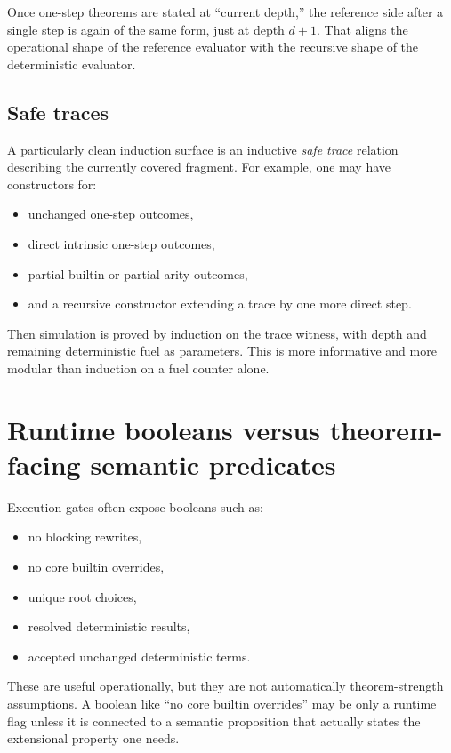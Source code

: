\documentclass[11pt]{article}
\newcommand{\term}[1]{\emph{#1}}
\begin{document}
Once one-step theorems are stated at ``current depth,'' the reference side after a single step is again of the same form, just at depth $d+1$. That aligns the operational shape of the reference evaluator with the recursive shape of the deterministic evaluator.

\subsection{Safe traces}

A particularly clean induction surface is an inductive \term{safe trace} relation describing the currently covered fragment. For example, one may have constructors for:

\begin{itemize}
  \item unchanged one-step outcomes,
  \item direct intrinsic one-step outcomes,
  \item partial builtin or partial-arity outcomes,
  \item and a recursive constructor extending a trace by one more direct step.
\end{itemize}

Then simulation is proved by induction on the trace witness, with depth and remaining deterministic fuel as parameters. This is more informative and more modular than induction on a fuel counter alone.

\section{Runtime booleans versus theorem-facing semantic predicates}

Execution gates often expose booleans such as:

\begin{itemize}
  \item no blocking rewrites,
  \item no core builtin overrides,
  \item unique root choices,
  \item resolved deterministic results,
  \item accepted unchanged deterministic terms.
\end{itemize}

These are useful operationally, but they are not automatically theorem-strength assumptions. A boolean like ``no core builtin overrides'' may be only a runtime flag unless it is connected to a semantic proposition that actually states the extensional property one needs.
\end{document}
